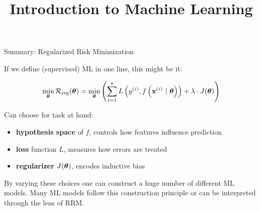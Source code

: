 \documentclass[11pt,compress,t,notes=noshow, xcolor=table]{beamer}
\title{Introduction to Machine Learning}
\begin{document}




\begin{vbframe}{Summary: Regularized Risk Minimization}

If we define (supervised) ML in one line, this might be it:

$$
\min_{\bm{\theta}} \mathcal{R}_{\text{reg}}(\bm{\theta})= \min_{\bm{\theta}} \left(\sum\limits_{i=1}^n L\left(y^{(i)}, f\left(\mathbf{x}^{(i)} ~|~ \bm{\theta}\right)\right) + \lambda \cdot J(\bm{\theta}) \right)
$$

Can choose for task at hand:

\begin{itemize}
  \item \textbf{hypothesis space} of $f$, controls how features influence prediction
  \item \textbf{loss} function $L$, measures how errors are treated
  \item \textbf{regularizer} $J(\bm{\theta})$, encodes inductive 
  bias 
\end{itemize}

\vfill

By varying these choices one can construct a huge number of different ML models. 
Many ML models follow this construction principle or can be interpreted through 
the lens of RRM.

\end{vbframe}

\end{document}
